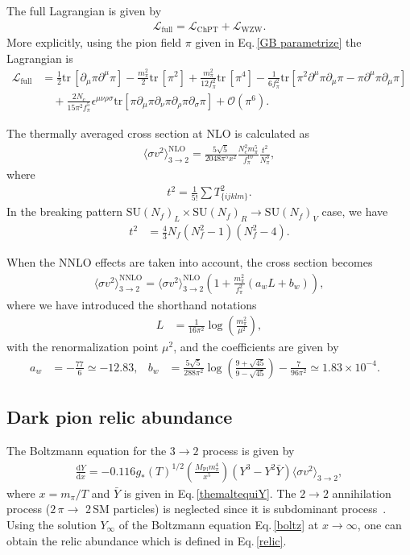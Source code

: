 \documentclass[a4paper,preprint,superscriptaddress,preprintnumbers,nofootinbib]{revtex4}
\newcommand{\SU}{\text{SU}}
\newcommand{\al}[1]{\begin{align}#1\end{align}}
\newcommand{\nn}{\nonumber\\}
\newcommand{\p}{\partial}
\newcommand{\df}{\text{d}}
\newcommand{\fn}[1]{\!\left(#1\right)}
\newcommand{\bra}{\langle}
\newcommand{\ket}{\rangle}
\newcommand{\Lag}{\mathcal L}
\newcommand{\tr}{\text{tr}}
\begin{document}
The full Lagrangian is given by
\al{
\Lag_\text{full}= \Lag_\text{ChPT} + \Lag_\text{WZW}.
}
More explicitly, using the pion field $\pi$ given in Eq.\,\eqref{GB parametrize} the Lagrangian is
\al{
\Lag_\text{full}
&=\frac{1}{2}\tr\,[\p_\mu \pi \p^\mu \pi] 
-\frac{m_\pi^2}{2}\tr\, [\pi^2]
+\frac{m_\pi^2}{12f_\pi^2}\tr\,[\pi^4]
-\frac{1}{6f_\pi^2}\tr[\pi^2\p^\mu \pi \p_\mu \pi -\pi \p^\mu \pi\p_\mu \pi]
\nn
&\quad +\frac{2N_c}{15\pi^2f_\pi^5}\epsilon^{\mu\nu\rho\sigma}\text{tr}[\pi \p_\mu \pi \p_\nu \pi \p_\rho \pi \p_\sigma \pi]+{\mathcal O}\fn{\pi^6}.
}

The thermally averaged cross section at NLO is calculated as~\cite{Hochberg:2014kqa}
\al{
\bra \sigma v^2\ket_{3\to2}^\text{NLO}=\frac{5\sqrt{5}}{2048\pi^5x^2}\frac{N_c^2m_\pi^5}{f_\pi^{10}}\frac{t^2}{N_\pi^3},
}
where 
\al{
t^2=\frac{1}{5!}\sum T^2_{\{ijklm\}}.
}
In the breaking pattern $\SU\fn{N_f}_L\times \SU\fn{N_f}_{R}\to \SU\fn{N_f}_V$ case, we have
\al{
t^2&=\frac{4}{3}N_f(N_f^2-1)(N_f^2-4).
} 

When the NNLO effects are taken into account, the cross section becomes~\cite{Hansen:2015yaa}
\al{
\bra \sigma v^2\ket_{3\to2}^\text{NNLO}=\bra \sigma v^2\ket_{3\to2}^\text{NLO}\left( 1+\frac{m_\pi^2}{f_\pi^2}(a_wL+b_w)\right),
}
where we have introduced the shorthand notations
\al{
L&=\frac{1}{16\pi^2}\log\fn{\frac{m_\pi^2}{\mu^2}},
}
with the renormalization point $\mu^2$, and the coefficients are given by
\al{
a_w&=-\frac{77}{6}\simeq -12.83,&
b_w&=\frac{5\sqrt{5}}{288\pi^2}\log\fn{\frac{9+\sqrt{45}}{9-\sqrt{45}}}-\frac{7}{96\pi^2}
\simeq 1.83\times 10^{-4}.&
}

\subsection{Dark pion relic abundance}
The Boltzmann equation for the $3\to2$ process is given by~\cite{Hochberg:2014kqa}
\al{
\frac{\df Y}{\df x} = -0.116g_*\fn{T}^{1/2}\left(\frac{M_\text{Pl}m_\pi^4}{x^5}\right)(Y^3-Y^2{\bar Y})\bra \sigma v^2\ket_{3\to2},
\label{boltz}
}
where $x=m_\pi/T$ and $\bar Y$ is given in Eq.\,\eqref{themaltequiY}.
The $2\to 2$ annihilation process ($2\, \pi\to $ 2\,SM particles) is neglected since it is subdominant process~\cite{Hochberg:2014kqa}.
Using the solution $Y_\infty$ of the Boltzmann equation Eq.\,\eqref{boltz} at $x\to \infty$, one can obtain the relic abundance which is defined in Eq.\,\eqref{relic}.
\end{document}
